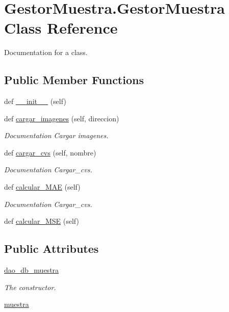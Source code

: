 \hypertarget{class_gestor_muestra_1_1_gestor_muestra}{}\section{Gestor\+Muestra.\+Gestor\+Muestra Class Reference}
\label{class_gestor_muestra_1_1_gestor_muestra}


Documentation for a class.  


\subsection*{Public Member Functions}
\begin{DoxyCompactItemize}
\item 
def \mbox{\hyperlink{class_gestor_muestra_1_1_gestor_muestra_a4ecb9256f16f15aa652b277297eb8879}{\+\_\+\+\_\+init\+\_\+\+\_\+}} (self)
\item 
def \mbox{\hyperlink{class_gestor_muestra_1_1_gestor_muestra_a0c299dcdb3bce0e7f20962a6873b0e08}{cargar\+\_\+imagenes}} (self, direccion)
\begin{DoxyCompactList}\small\item\em Documentation Cargar imagenes. \end{DoxyCompactList}\item 
def \mbox{\hyperlink{class_gestor_muestra_1_1_gestor_muestra_a7d6fa56236d5489c7f042c789534923a}{cargar\+\_\+cvs}} (self, nombre)
\begin{DoxyCompactList}\small\item\em Documentation Cargar\+\_\+cvs. \end{DoxyCompactList}\item 
def \mbox{\hyperlink{class_gestor_muestra_1_1_gestor_muestra_acebabfbe69aec441abcb8386119ce214}{calcular\+\_\+\+M\+AE}} (self)
\begin{DoxyCompactList}\small\item\em Documentation Cargar\+\_\+cvs. \end{DoxyCompactList}\item 
def \mbox{\hyperlink{class_gestor_muestra_1_1_gestor_muestra_a9bd243e64416b0ed556a25d5b3aa7e84}{calcular\+\_\+\+M\+SE}} (self)
\end{DoxyCompactItemize}
\subsection*{Public Attributes}
\begin{DoxyCompactItemize}
\item 
\mbox{\hyperlink{class_gestor_muestra_1_1_gestor_muestra_a98e28a5be300d9a4d9a81f80a247bb8c}{dao\+\_\+db\+\_\+muestra}}
\begin{DoxyCompactList}\small\item\em The constructor. \end{DoxyCompactList}\item 
\mbox{\hyperlink{class_gestor_muestra_1_1_gestor_muestra_a8d6a05f57dff535554fdae740f91fadb}{muestra}}
\end{DoxyCompactItemize}


